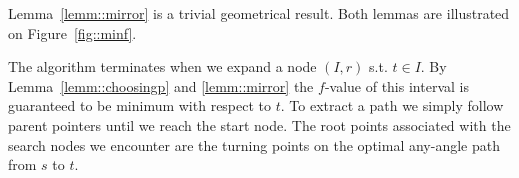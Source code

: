 Lemma~\ref{lemm::mirror} is a trivial geometrical result.  
Both lemmas are illustrated on Figure~\ref{fig::minf}.  



The algorithm terminates when we expand a node $(I, r)$ s.t.
$t \in I$. By Lemma~\ref{lemm::choosingp} and \ref{lemm::mirror} 
the $f$-value of this
interval is guaranteed to be minimum with respect to $t$.
To extract a path we simply follow parent pointers until we
reach the start node.
The root points associated with the search nodes we encounter
are the turning points on the optimal any-angle path from 
$s$ to $t$. 

